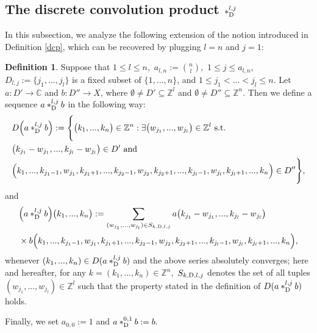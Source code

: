 \documentclass{amsart}
\theoremstyle{definition}
\newtheorem{defn}[thm]{Definition}
\theoremstyle{remark}
\numberwithin{equation}{section}
\begin{document}
\subsection{The discrete convolution product $\ast_{{\rm D}}^{l,j}$}\label{ima}

In this subsection, we analyze the following extension of the notion introduced in Definition \ref{dcp}, which can be recovered by plugging $l=n$ and $j=1:$

\begin{defn}\label{dcplj}
Suppose that $1\leq l\leq n,$ $a_{l,n}:={n\choose l},$ $1\leq j\leq a_{l,n}$, $D_{l,j}:=\{j_{1},...,j_{l}\}$ is a fixed subset of $\{1,...,n\}$, and $1\leq j_{1}<...<j_{l}\leq n.$ Let $a:D' \rightarrow {\mathbb C}$ and $b: D'' \rightarrow X$, where $\emptyset \neq D' \subseteq {\mathbb Z}^{l}$ and $\emptyset \neq D'' \subseteq {\mathbb Z}^{n}$. Then we define a sequence $a \ast_{{\rm D}}^{l,j}b$ in the following way:
\begin{align*} &
D\Bigl(a \ast_{{\rm D}}^{l,j}b \Bigr):=\Biggl\{ \bigl(k_{1},...,k_{n}\bigr) \in {\mathbb Z}^{n} : \exists \bigl( w_{j_{1}},...,w_{j_{l}} \bigr)\in {\mathbb Z}^{l} \mbox{ s.t. }\\&
\bigl( k_{j_{1}}-w_{j_{1}},...,k_{j_{l}}-w_{j_{l}} \bigr)\in D'\mbox{ and }
\\&
\Bigl(k_{1},...,k_{j_{1}-1},w_{j_{1}},k_{j_{1}+1},...,k_{j_{2}-1},w_{j_{2}},k_{j_{2}+1},...,k_{j_{l}-1}, w_{j_{l}},k_{j_{l}+1},...,k_{n}\Bigr)\in D''
\Biggr\},
\end{align*}
and
\begin{align*} &
\Bigl(a \ast_{{\rm D}}^{l,j}b \Bigr)\bigl(k_{1},...,k_{n}\bigr):=\sum_{( w_{j_{1}},...,w_{j_{l}} )\in S_{k,{\rm D},l,j}}a\bigl( k_{j_{1}}-w_{j_{1}},...,k_{j_{l}}-w_{j_{l}} \bigr)
\\& \times  b\Bigl(k_{1},...,k_{j_{1}-1},w_{j_{1}},k_{j_{1}+1},...,k_{j_{2}-1},w_{j_{2}},k_{j_{2}+1},...,k_{j_{l}-1}, w_{j_{l}},k_{j_{l}+1},...,k_{n}\Bigr) ,
\end{align*}
whenever $(k_{1},...,k_{n}) \in D(a \ast_{{\rm D}}^{l,j}b ) $ and the above series absolutely converges; here and hereafter, for any $k=(k_{1},...,k_{n}) \in {\mathbb Z}^{n},$ $S_{k,{\rm D},l,j}$ denotes the set of all tuples $( w_{j_{1}},...,w_{j_{l}}  )\in {\mathbb Z}^{l}$ such that the property stated in the definition of $D(a \ast_{{\rm D}}^{l,j}b)$ holds.

Finally, we set $a_{0,0}:=1$ and $a \ast_{{\rm D}}^{0,1}b:=b.$
\end{defn}
\end{document}
